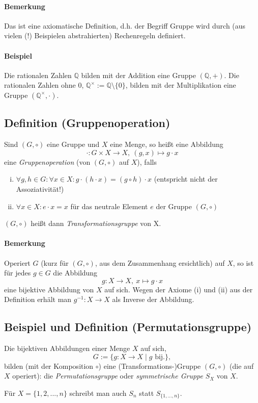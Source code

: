  	\paragraph{Bemerkung}
 		Das ist eine axiomatische Definition, d.h. der Begriff \glqq Gruppe\grqq{} wird durch (aus vielen (!) Beispielen abstrahierten) \glqq Rechenregeln\grqq{} definiert.
 	\paragraph{Beispiel}
 		Die rationalen Zahlen $\mathbb{Q}$ bilden mit der Addition eine Gruppe $(\mathbb{Q} ,+)$.
 		Die rationalen Zahlen ohne $0$, $\mathbb{Q}^{\times} := \mathbb{Q}\setminus \{0\}$, bilden mit der Multiplikation eine Gruppe $(\mathbb{Q}^\times ,\cdot)$.

 \subsection{Definition (Gruppenoperation)}
 	\begin{Definition}[Gruppenoperation]
 		Sind $(G,\circ )$ eine Gruppe und $X$ eine Menge, so heißt eine Abbildung
 		\[
 			\cdot : G\times X\to X,\ (g,x)\mapsto g\cdot x
 		\]
 		eine \emph{Gruppenoperation} (von $(G,\circ )$ auf $X$), falls
 		\begin{enumerate}[(i)]
 			\item $\forall g,h\in G :\forall x\in X: g\cdot (h\cdot x) = (g\circ h)\cdot x$ (entspricht nicht der Assoziativität!)
 			\item $\forall x\in X: e\cdot x = x$ für das neutrale Element $e$ der Gruppe $(G,\circ )$
 		\end{enumerate}
 		$(G,\circ )$ heißt dann \emph{Transformationsgruppe} von X.
 	\end{Definition}

 	\paragraph{Bemerkung}
 		Operiert $G$ (kurz für $(G,\circ )$, aus dem Zusammenhang ersichtlich) auf $X$, so ist für jedes $g\in G$ die Abbildung
 		\[
 			g:X\to X,\ x\mapsto g\cdot x
 		\]
 		eine bijektive Abbildung von $X$ auf sich. Wegen der Axiome (i) und (ii) aus der Definition erhält man $g^{-1}: X\to X$ als Inverse der Abbildung.

 \subsection{Beispiel und Definition (Permutationsgruppe)}
 	\begin{Definition}[Permutationsgruppe]
 		Die bijektiven Abbildungen einer Menge $X$ auf sich,
 		\[
 			G:= \{g:X\to X\mid g \text{ bij.}\},
 		\]
 		bilden (mit der Komposition $\circ$) eine (Transformations-)Gruppe $(G,\circ )$ (die auf $X$ operiert): die \emph{Permutationsgruppe} oder \emph{symmetrische Gruppe} $S_X$ von $X$.

 		Für $X=\{1,2,...,n\}$ schreibt man auch $S_n$ statt $S_{\{1,...,n\}}$.
 	\end{Definition}
